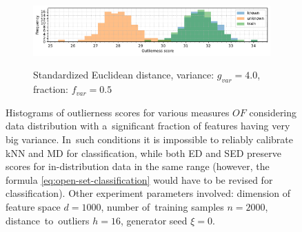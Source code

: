 \begin{figure}[t]
\begin{subfigure}[b]{\textwidth}
        \caption{\small Standardized Euclidean distance, variance: $g_{var} = 4.0$, fraction: $f_{var} = 0.5$}
        \includegraphics[width=\textwidth]{images/variances/hists-extreme/hist-variances-n_varied_0.50-variance_4.00-distance_16-outliers_varied_False-model_SED-seed_0.pdf}
        \label{fig:hists-variances-extreme-sed}
    \end{subfigure}
    \caption{Histograms of outlierness scores for various measures $OF$ considering data distribution with a~significant fraction of features having very big variance. In~such conditions it is impossible to reliably calibrate kNN and MD for classification, while both ED and SED preserve scores for in-distribution data in the same range (however, the formula \ref{eq:open-set-classification} would have to be revised for classification). Other experiment parameters involved: dimension of feature space $d = 1000$, number of~training samples $n = 2000$, distance~to~outliers $h = 16$, generator seed $\xi = 0$.}
    \label{fig:hists-variances-extreme}
\end{figure}

\cleardoublepage{}
